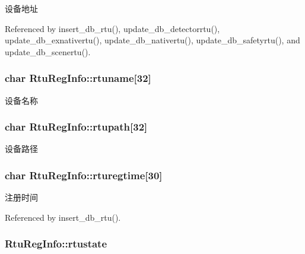 设备地址 



Referenced by insert\-\_\-db\-\_\-rtu(), update\-\_\-db\-\_\-detectorrtu(), update\-\_\-db\-\_\-exnativertu(), update\-\_\-db\-\_\-nativertu(), update\-\_\-db\-\_\-safetyrtu(), and update\-\_\-db\-\_\-scenertu().

\hypertarget{structRtuRegInfo_a390a2ef91f80d812946dfafea26b23a1}{
\subsubsection[{rtuname}]{\setlength{\rightskip}{0pt plus 5cm}char Rtu\-Reg\-Info\-::rtuname\mbox{[}32\mbox{]}}}\label{structRtuRegInfo_a390a2ef91f80d812946dfafea26b23a1}


设备名称 

\hypertarget{structRtuRegInfo_a1e566f9bc82c3366aec587cbf618899c}{
\subsubsection[{rtupath}]{\setlength{\rightskip}{0pt plus 5cm}char Rtu\-Reg\-Info\-::rtupath\mbox{[}32\mbox{]}}}\label{structRtuRegInfo_a1e566f9bc82c3366aec587cbf618899c}


设备路径 

\hypertarget{structRtuRegInfo_a1f2c3c801990368f9dad237d7d7be01c}{
\subsubsection[{rturegtime}]{\setlength{\rightskip}{0pt plus 5cm}char Rtu\-Reg\-Info\-::rturegtime\mbox{[}30\mbox{]}}}\label{structRtuRegInfo_a1f2c3c801990368f9dad237d7d7be01c}


注册时间 



Referenced by insert\-\_\-db\-\_\-rtu().

\hypertarget{structRtuRegInfo_af41795f7f1ce079734677e5e6fa77573}{
\subsubsection[{rtustate}]{ Rtu\-Reg\-Info\-::rtustate}}\label{structRtuRegInfo_af41795f7f1ce079734677e5e6fa77573}


